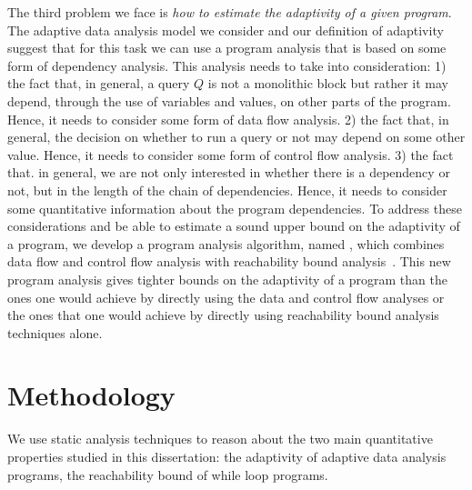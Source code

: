 The third problem we face is \emph{how to estimate the adaptivity of a given program}. 
The adaptive data analysis model we consider and our definition of adaptivity suggest that for this task we can use a  program analysis that is based on some form of dependency analysis. This analysis needs to take into consideration:
1) the fact that, in general, a query $Q$ is not a monolithic block but rather it may depend, through the use of variables and values, on other parts of the program. 
Hence, it needs to consider some form of data flow analysis. 
2) the fact that, in general, the decision on whether to run a query or not may depend on some other value. Hence, 
 it needs to consider some form of control flow analysis.
3) the fact that. in general, we are not only interested in whether there is a dependency or not, but in the length of the chain of dependencies. 
Hence, it needs to consider some quantitative information about the program dependencies. %
To address these considerations and be able to estimate a sound upper bound on the adaptivity of a program, 
we develop a program analysis algorithm, named {\ADAPTSYSTEM}, which combines data flow and control flow analysis with reachability bound analysis~\cite{GulwaniZ10}. 
This new program analysis gives tighter bounds on the adaptivity of a program than the ones one would achieve by directly using the data and control flow analyses or the ones that one would achieve by directly using reachability bound analysis techniques alone.
\section{Methodology}
We use static analysis techniques to reason about the two main quantitative properties studied in this dissertation: 
the adaptivity of adaptive data analysis programs,
the reachability bound of while loop programs. 

